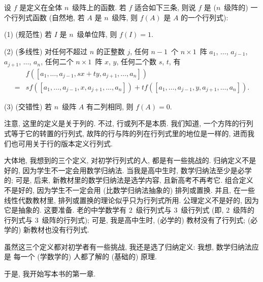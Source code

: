 \documentclass[../libro]{subfiles}
\begin{document}
\begin{definition}[公理定义]
    设 \(f\) 是定义在全体 \(n\)~级阵上的函数.
    若 \(f\) 适合如下三条, 则说
    \(f\) 是 (\(n\)~级阵的) 一个行列式函数
    (自然地, 若 \(A\) 是 \(n\)~级阵,
    则 \(f(A)\) 是 \(A\) 的一个行列式):

    (1)
    (规范性)
    若 \(I\) 是 \(n\)~级单位阵,
    则 \(f(I) = 1\).

    (2)
    (多线性)
    对任何不超过 \(n\) 的正整数 \(j\),
    任何 \(n-1\)~个 \(n \times 1\)~阵
    \(a_1\), \(\dots\), \(a_{j-1}\),
    \(a_{j+1}\), \(\dots\), \(a_n\),
    任何二个 \(n \times 1\)~阵 \(x\), \(y\),
    任何二个数 \(s\), \(t\),
    有
    \begin{align*}
             & f
            {([a_1, \dots, a_{j-1}, sx + ty,
                        a_{j+1}, \dots, a_n])}
        \\
        = {} &
        s
        f {([a_1, \dots, a_{j-1}, x, a_{j+1}, \dots, a_n])}
        +
        t
        f {([a_1, \dots, a_{j-1}, y, a_{j+1}, \dots, a_n])}.
    \end{align*}

    (3)
    (交错性)
    若 \(n\)~级阵 \(A\) 有二列相同,
    则 \(f {(A)} = 0\).
\end{definition}

注意, 这里的定义是关于列的.
不过, 行或列不是本质.
我们知道, 一个方阵的行列式等于它的转置的行列式,
故阵的行与阵的列在行列式里的地位是一样的,
进而我们也可用关于行的版本定义行列式.

大体地, 我想到的三个定义,
对初学行列式的人,
都是有一些挑战的.
归纳定义不是好的, 因为学生不一定会用数学归纳法.
当我是高中生时, 数学归纳法至少是必学的;
可是, 后来, 新教材里的数学归纳法是选学内容,
且新高考不再考它.
组合定义不是好的, 因为学生不一定会用
(比数学归纳法抽象的) 排列或置换.
并且,
在一些线性代数教材里,
排列或置换的理论似乎只为行列式所用.
公理定义不是好的, 因为它是抽象的.
这要准备.
老的中学数学有
\(2\)~级行列式与 \(3\)~级行列式
(即, \(2\)~级阵的行列式与 \(3\)~级阵的行列式);
可是, 我是高中生时, (必学的) 教材没有了行列式;
(必学的) 新教材也没有行列式.

虽然这三个定义都对初学者有一些挑战,
我还是选了归纳定义:
我想, 数学归纳法应是%
每一个 (学数学的) 人都了解的 (基础的) 原理.

于是, 我开始写本书的第一章.
\end{document}
